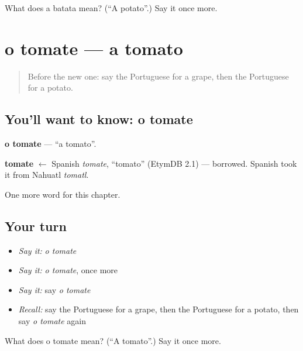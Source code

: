 \begin{tcolorbox}[breakable,colback=teal!4,colframe=teal!35!black,title={Before you move on}]
What does a batata mean? (\textquotedblleft{}A potato\textquotedblright{}.) Say it once more.
\end{tcolorbox}
\section[o tomate]{o tomate — a tomato}

\label{lesson:PT-C46-tomate}



\begin{quote}
Before the new one: say the Portuguese for a grape, then the Portuguese for a potato.
\end{quote}

\subsection*{You'll want to know: o tomate}
\textbf{o tomate} — \textquotedblleft{}a tomato\textquotedblright{}.

\begin{cousinweb}
\textbf{tomate} $\leftarrow$ Spanish \emph{tomate}, \textquotedblleft{}tomato\textquotedblright{} (EtymDB 2.1) — borrowed. Spanish took it from Nahuatl \emph{tomatl}.
\end{cousinweb}

\begin{grammarlens}[title={What you've built}]
One more word for this chapter.
\end{grammarlens}

\subsection*{Your turn}
\begin{itemize}
\raggedright
  \item \emph{Say it:} \emph{o tomate}
  \item \emph{Say it:} \emph{o tomate}, once more
  \item \emph{Say it:} say \emph{o tomate}
  \item \emph{Recall:} say the Portuguese for a grape, then the Portuguese for a potato, then say \emph{o tomate} again
\end{itemize}

\begin{tcolorbox}[breakable,colback=teal!4,colframe=teal!35!black,title={Before you move on}]
What does o tomate mean? (\textquotedblleft{}A tomato\textquotedblright{}.) Say it once more.
\end{tcolorbox}
